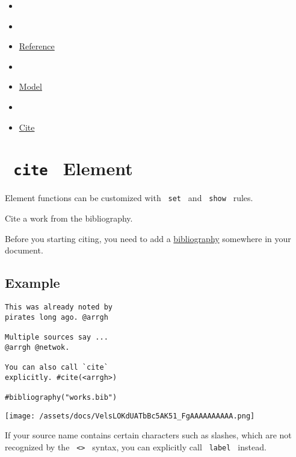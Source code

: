 \begin{itemize}
\tightlist
\item
  \href{/docs}{}
\item
  
\item
  \href{/docs/reference/}{Reference}
\item
  
\item
  \href{/docs/reference/model/}{Model}
\item
  
\item
  \href{/docs/reference/model/cite/}{Cite}
\end{itemize}

\section{\texorpdfstring{\texttt{\ cite\ } {{ Element
}}}{ cite   Element }}\label{summary}

\label{element-tooltip}
Element functions can be customized with \texttt{\ set\ } and
\texttt{\ show\ } rules.

Cite a work from the bibliography.

Before you starting citing, you need to add a
\href{/docs/reference/model/bibliography/}{bibliography} somewhere in
your document.

\subsection{Example}\label{example}

\begin{verbatim}
This was already noted by
pirates long ago. @arrgh

Multiple sources say ...
@arrgh @netwok.

You can also call `cite`
explicitly. #cite(<arrgh>)

#bibliography("works.bib")
\end{verbatim}

\texttt{[image: /assets/docs/VelsLOKdUATbBc5AK51\_FgAAAAAAAAAA.png]}

If your source name contains certain characters such as slashes, which
are not recognized by the \texttt{\ \textless{}\textgreater{}\ } syntax,
you can explicitly call \texttt{\ label\ } instead.

